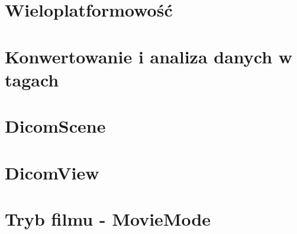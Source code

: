 
\section{Wieloplatformowość}


\section{Konwertowanie i analiza danych w tagach}


\section{DicomScene}


\section{DicomView}


\section{Tryb filmu - MovieMode}

